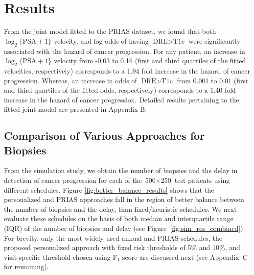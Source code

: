
\section{Results}
\label{sec:results}
From the joint model fitted to the PRIAS dataset, we found that both $\log_2 \{\mbox{PSA} + 1\}$ velocity,  and log odds of having $\mbox{DRE} > \mbox{T1c}$  were significantly associated with the hazard of cancer progression. For any patient, an increase in $\log_2 \{\mbox{PSA} + 1\}$ velocity from -0.03 to 0.16 (first and third quartiles of the fitted velocities, respectively) corresponds to a 1.94 fold increase in the hazard of cancer progression. Whereas, an increase in odds of $\mbox{DRE} > \mbox{T1c}$ from 0.001 to 0.01 (first and third quartiles of the fitted odds, respectively) corresponds to a 1.40 fold increase in the hazard of cancer progression. Detailed results pertaining to the fitted joint model are presented in Appendix B.

\subsection{Comparison of Various Approaches for Biopsies}
From the simulation study, we obtain the number of biopsies and the delay in detection of cancer progression for each of the ${\mbox{500} \times \mbox{250}}$ test patients using different schedules. Figure \ref{fig:better_balance_results} shows that the personalized and PRIAS approaches fall in the region of better balance between the number of biopsies and the delay, than fixed/heuristic schedules. We next evaluate these schedules on the basis of both median and interquartile range (IQR) of the number of biopsies and delay (see Figure~\ref{fig:sim_res_combined}). For brevity, only the most widely used annual and PRIAS schedules, the proposed personalized approach with fixed risk thresholds of 5\% and 10\%, and visit-specific threshold chosen using $\mbox{F}_1$ score are discussed next (see Appendix~C for remaining).

